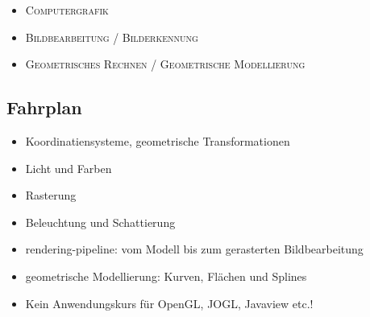 \begin{itemize}
 \item \textsc{\color{red}Computergrafik}
 \item \textsc{\color{green}Bildbearbeitung / Bilderkennung}
 \item \textsc{\color{blue}Geometrisches Rechnen / Geometrische Modellierung}
\end{itemize}

\subsection{Fahrplan}
\begin{itemize}
 \item Koordinatiensysteme, geometrische Transformationen
 \item Licht und Farben
 \item Rasterung
 \item Beleuchtung und Schattierung
 \item rendering-pipeline: vom Modell bis zum gerasterten Bildbearbeitung
 \item geometrische Modellierung: Kurven, Flächen und Splines
 \item {\color{red}\large Kein Anwendungskurs für OpenGL, JOGL, Javaview etc.!}
\end{itemize}

